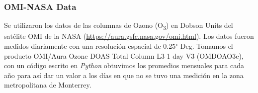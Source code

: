 \subsubsection{OMI-NASA Data}
Se utilizaron los datos de las columnas de Ozono (O\textsubscript{3}) en Dobson Units del satélite OMI de la NASA (\url{https://aura.gsfc.nasa.gov/omi.html}). Los datos fueron medidos diariamente con una resolución espacial de 0.25$^{\circ}$ Deg. Tomamos el producto OMI/Aura Ozone DOAS Total Column L3 1 day V3 (OMDOAO3e), con un código escrito en \textit{Python} obtuvimos los promedios mensuales para cada año para así dar un valor a los días en que no se tuvo una medición en la zona metropolitana de Monterrey.